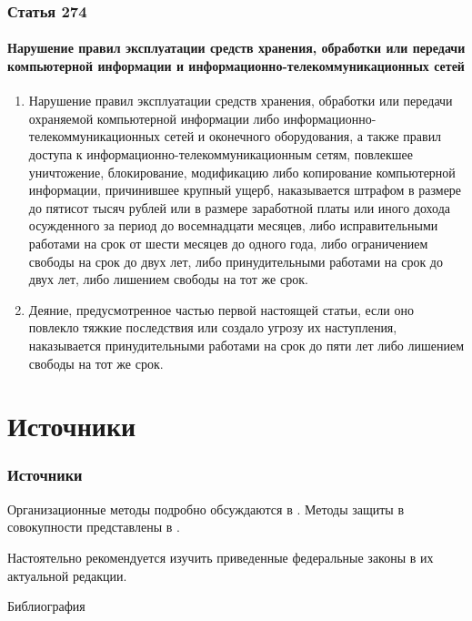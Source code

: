 \begin{frame}[allowframebreaks]
    \frametitle{Статья 274}
    \framesubtitle{Нарушение правил эксплуатации средств хранения, обработки или передачи компьютерной информации и информационно-телекоммуникационных сетей}
    \begin{enumerate}
        \item Нарушение правил эксплуатации средств хранения, обработки или передачи охраняемой компьютерной информации либо информационно-телекоммуникационных сетей и оконечного оборудования, а также правил доступа к информационно-телекоммуникационным сетям, повлекшее уничтожение, блокирование, модификацию либо копирование компьютерной информации, причинившее крупный ущерб, наказывается штрафом в размере до пятисот тысяч рублей или в размере заработной платы или иного дохода осужденного за период до восемнадцати месяцев, либо исправительными работами на срок от шести месяцев до одного года, либо ограничением свободы на срок до двух лет, либо принудительными работами на срок до двух лет, либо лишением свободы на тот же срок.
        
        \item Деяние, предусмотренное частью первой настоящей статьи, если оно повлекло тяжкие последствия или создало угрозу их наступления, наказывается принудительными работами на срок до пяти лет либо лишением свободы на тот же срок.
    \end{enumerate}
\end{frame}


\section{Источники}
\begin{frame}
    \frametitle{Источники}
    Организационные методы подробно обсуждаются в \cite{bib:romanov:org}. Методы защиты в совокупности представлены в \cite{bib:yaroch:infsec}. 
    
    Настоятельно рекомендуется изучить приведенные федеральные законы в их актуальной редакции.
\end{frame}


\begin{frame}[allowframebreaks]{Библиография}
    
    
\end{frame}

